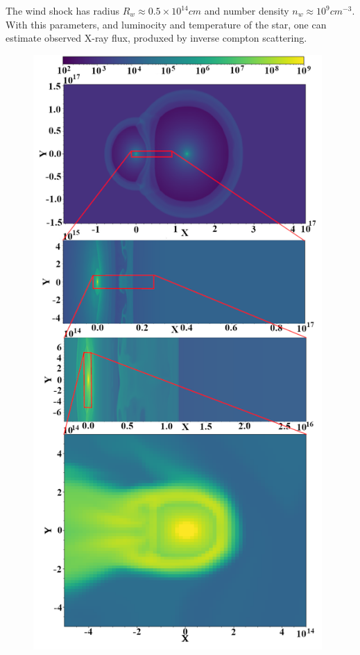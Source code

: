 \documentclass[a4paper,12pt]{extreport}
\begin{document}
The wind shock has radius $R_w \approx 0.5\times10^{14} cm$ and number density $n_w \approx 10^9 cm^{-3}$. With this parameters, and luminocity and temperature of the star, one can estimate observed X-ray flux, produxed by inverse compton scattering.
\begin{figure}[h!]
	\centering
	\begin{minipage}{0.48\textwidth}
		\centering
		\includegraphics[width=0.98\textwidth]{./fig/density.png} 

\end{minipage}
\end{figure}
\end{document}
